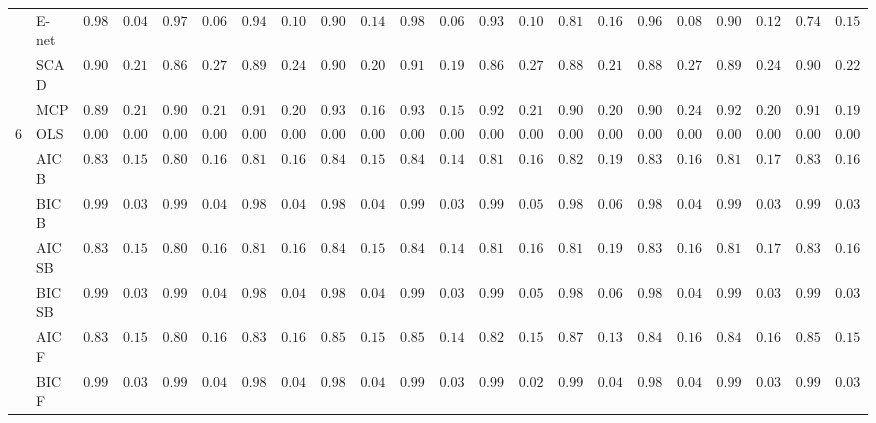 \begin{tabular}{llllllllllllllllllllll}
	& E-net  & $0.9883$ & $0.0427$ & $0.9717$ & $0.0672$ & $0.9467$ & $0.1082$ & $0.9017$ & $0.1403$ & $0.9867$ & $0.0612$ & $0.9333$ & $0.1086$ & $0.8150$ & $0.1605$ & $0.9683$ & $0.0877$ & $0.9017$ & $0.1256$ & $0.7400$ & $0.1523$ \\
	& SCAD  & $0.9000$ & $0.2145$ & $0.8617$ & $0.2783$ & $0.8917$ & $0.2409$ & $0.9083$ & $0.2043$ & $0.9133$ & $0.1931$ & $0.8617$ & $0.2763$ & $0.8883$ & $0.2159$ & $0.8850$ & $0.2749$ & $0.8900$ & $0.2498$ & $0.9033$ & $0.2250$ \\
	& MCP  & $0.8983$ & $0.2144$ & $0.9083$ & $0.2176$ & $0.9133$ & $0.2017$ & $0.9317$ & $0.1626$ & $0.9350$ & $0.1533$ & $0.9250$ & $0.2137$ & $0.9050$ & $0.2096$ & $0.9000$ & $0.2404$ & $0.9200$ & $0.2044$ & $0.9133$ & $0.1946$ \\
	6 & OLS  & $0.0000$ & $0.0000$ & $0.0000$ & $0.0000$ & $0.0000$ & $0.0000$ & $0.0000$ & $0.0000$ & $0.0000$ & $0.0000$ & $0.0000$ & $0.0000$ & $0.0000$ & $0.0000$ & $0.0000$ & $0.0000$ & $0.0000$ & $0.0000$ & $0.0000$ & $0.0000$ \\
	& AIC B  & $0.8317$ & $0.1526$ & $0.8033$ & $0.1698$ & $0.8167$ & $0.1683$ & $0.8467$ & $0.1583$ & $0.8467$ & $0.1473$ & $0.8100$ & $0.1675$ & $0.8200$ & $0.1934$ & $0.8383$ & $0.1666$ & $0.8183$ & $0.1726$ & $0.8300$ & $0.1624$ \\
	& BIC B  & $0.9917$ & $0.0365$ & $0.9900$ & $0.0463$ & $0.9883$ & $0.0489$ & $0.9867$ & $0.0454$ & $0.9900$ & $0.0398$ & $0.9900$ & $0.0571$ & $0.9850$ & $0.0631$ & $0.9883$ & $0.0489$ & $0.9917$ & $0.0365$ & $0.9917$ & $0.0365$ \\
	& AIC SB  & $0.8317$ & $0.1526$ & $0.8033$ & $0.1698$ & $0.8167$ & $0.1683$ & $0.8467$ & $0.1583$ & $0.8467$ & $0.1473$ & $0.8100$ & $0.1675$ & $0.8183$ & $0.1926$ & $0.8383$ & $0.1666$ & $0.8183$ & $0.1726$ & $0.8300$ & $0.1624$ \\
	& BIC SB  & $0.9917$ & $0.0365$ & $0.9900$ & $0.0463$ & $0.9883$ & $0.0489$ & $0.9867$ & $0.0454$ & $0.9900$ & $0.0398$ & $0.9900$ & $0.0571$ & $0.9850$ & $0.0631$ & $0.9883$ & $0.0489$ & $0.9917$ & $0.0365$ & $0.9917$ & $0.0365$ \\
	& AIC F  & $0.8317$ & $0.1526$ & $0.8033$ & $0.1698$ & $0.8333$ & $0.1658$ & $0.8533$ & $0.1503$ & $0.8500$ & $0.1431$ & $0.8233$ & $0.1514$ & $0.8717$ & $0.1399$ & $0.8417$ & $0.1665$ & $0.8400$ & $0.1640$ & $0.8550$ & $0.1529$ \\
	& BIC F  & $0.9917$ & $0.0365$ & $0.9900$ & $0.0463$ & $0.9883$ & $0.0489$ & $0.9867$ & $0.0454$ & $0.9900$ & $0.0398$ & $0.9950$ & $0.0286$ & $0.9917$ & $0.0435$ & $0.9883$ & $0.0489$ & $0.9917$ & $0.0365$ & $0.9917$ & $0.0365$ \\

\end{tabular}
